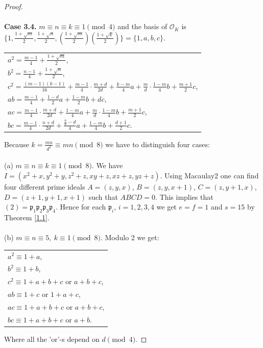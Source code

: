 \documentclass[10pt,a4paper]{amsart}
\begin{document}
\begin{proof}
\\ \\
\textbf{Case 3.4.}  $ m\equiv n \equiv k \equiv 1 \pmod{4}$ and the basis of $\mathcal{O}_K$ is $\{1, \frac{1+\sqrt{m}}{2}, \frac{1+\sqrt{n}}{2},(\frac{1+\sqrt{m}}{2})(\frac{1+\sqrt{k}}{2})  \} = \{1,a,b,c\}$. 
\begin{center}
\begin{tabular}{@{}l@{}}
$a^2 = \frac{m-1}{4} + \frac{1+\sqrt{m}}{2}   $,\\
$b^2 = \frac{n-1}{4} + \frac{1+\sqrt{n}}{2}   $,\\
$c^2  =  \frac{(m-1)(k-1)}{16}  + \frac{m-1}{4} \cdot \frac{m+d}{2d} + \frac{k-m}{4}a + \frac{m}{d} \cdot \frac{1-m}{4}b + \frac{m+1}{2}c  $,\\
$ab = \frac{m-1}{4} + \frac{1-d}{2}a + \frac{1-m}{2}b + dc $,\\
$ac = \frac{m-1}{4} \cdot \frac{m+d}{2d} + \frac{1-m}{4}a + \frac{m}{d} \cdot \frac{1-m}{4}b + \frac{m+1}{2}c  $,\\
$bc = \frac{m-1}{4} \cdot \frac{n+d}{2d} +  \frac{\frac{n}{d}-d}{4}a + \frac{1-m}{4}b+ \frac{d+1}{2}c  $.
\end{tabular}
\end{center}
Because $k = \frac{mn}{d^2} \equiv mn \pmod{8}$ we have to distinguish four cases:
\\ \\
(a) $m \equiv n \equiv k \equiv 1 \pmod{8}$. We have $I = (x^2+x,y^2+y,z^2+z,xy+z,xz+z,yz+z)$. Using Macaulay2 one can find four different prime ideals $A = (z,y,x)$, $B = (z,y,x+1) $, $C = (z,y+1,x)$, $D = (z+1,y+1,x+1) $ such that $ABCD = 0.$ This implies that $ (2) = \mathfrak{p}_1\mathfrak{p}_2\mathfrak{p}_3\mathfrak{p}_4$. Hence for each $\mathfrak{p}_i$, $i=1,2,3,4$ we get $ e=f=1$ and $ s=15$ by Theorem \ref{1.1}.
\\ \\
(b) $m \equiv n \equiv 5,\  k \equiv 1 \pmod{8}$. Modulo 2 we get:
\begin{center}
\begin{tabular}{@{}l@{}}
$a^2 \equiv 1 +a$,\\
$b^2 \equiv 1 + b$,\\
$c^2 \equiv 1 +a + b + c \text{ or }  a + b + c$, \\
$ab \equiv 1+c \text{ or } 1+a+c$, \\
$ac \equiv  1+a + b + c \text{ or }  a + b + c$, \\
$bc \equiv 1+a + b + c \text{ or } a + b $.
\end{tabular}
\end{center}
Where all the 'or'-s depend on $d \pmod{4}$.


\end{proof}
\end{document}
